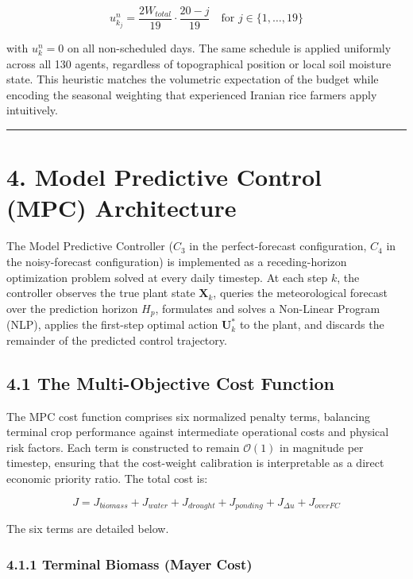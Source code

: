 \[u_{k_j}^n = \frac{2 W_{total}}{19} \cdot \frac{20 - j}{19} \quad \text{for } j \in \{1, \ldots, 19\} \tag{8}\]

with \(u_k^n = 0\) on all non-scheduled days. The same schedule is
applied uniformly across all 130 agents, regardless of topographical
position or local soil moisture state. This heuristic matches the
volumetric expectation of the budget while encoding the seasonal
weighting that experienced Iranian rice farmers apply intuitively.

\begin{center}\rule{0.5\linewidth}{0.5pt}\end{center}

\section{4. Model Predictive Control (MPC)
Architecture}\label{model-predictive-control-mpc-architecture}

The Model Predictive Controller (\(C_3\) in the perfect-forecast
configuration, \(C_4\) in the noisy-forecast configuration) is
implemented as a receding-horizon optimization problem solved at every
daily timestep. At each step \(k\), the controller observes the true
plant state \(\mathbf{X}_k\), queries the meteorological forecast over
the prediction horizon \(H_p\), formulates and solves a Non-Linear
Program (NLP), applies the first-step optimal action \(\mathbf{U}_k^*\)
to the plant, and discards the remainder of the predicted control
trajectory.

\subsection{4.1 The Multi-Objective Cost
Function}\label{the-multi-objective-cost-function}

The MPC cost function comprises six normalized penalty terms, balancing
terminal crop performance against intermediate operational costs and
physical risk factors. Each term is constructed to remain
\(\mathcal{O}(1)\) in magnitude per timestep, ensuring that the
cost-weight calibration is interpretable as a direct economic priority
ratio. The total cost is:

\[J = J_{biomass} + J_{water} + J_{drought} + J_{ponding} + J_{\Delta u} + J_{overFC} \tag{9}\]

The six terms are detailed below.

\subsubsection{4.1.1 Terminal Biomass (Mayer
Cost)}\label{terminal-biomass-mayer-cost}


